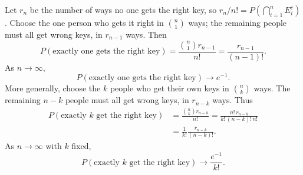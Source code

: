 \begin{example}
  Let $r_n$ be the number of ways no one gets the right key, so
  $r_n/n!=P\left(\bigcap_{i=1}^n E_i^c\right)$.
  Choose the one person who gets it right in $\binom n1$ ways;
  the remaining people must all get wrong keys, in $r_{n-1}$ ways. Then
  \[
    P(\text{exactly one gets the right key})
    =\frac{\binom n1 r_{n-1}}{n!}
    =\frac{r_{n-1}}{(n-1)!}.
  \]
  As $n\to\infty$,
  \[
    P(\text{exactly one gets the right key})\longrightarrow e^{-1}.
  \]
  More generally, choose the $k$ people who get their own keys in $\binom nk$ ways.
  The remaining $n-k$ people must all get wrong keys, in $r_{n-k}$ ways. Thus
  \begin{align*}
    P(\text{exactly }k\text{ get the right key})
     & =\frac{\binom nk r_{n-k}}{n!}
    =\frac{n!\,r_{n-k}}{k!\,(n-k)!\,n!}   \\
     & =\frac1{k!}\frac{r_{n-k}}{(n-k)!}.
  \end{align*}
  As $n\to\infty$ with $k$ fixed,
  \[
    P(\text{exactly }k\text{ get the right key})
    \longrightarrow\frac{e^{-1}}{k!}.
  \]
\end{example}
